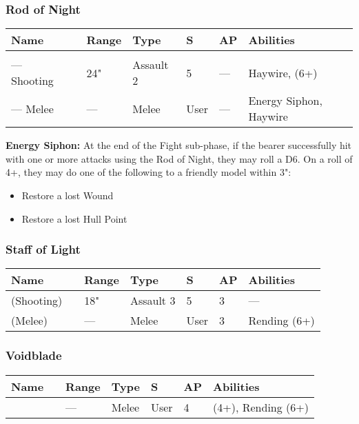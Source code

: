 \subsubsection{Rod of Night} \label{Rod of Night}
\noindent
\begin{tabular}{||m{110pt} m{30pt} m{31pt} m{55pt} m{12pt} m{12pt} m{210pt}||}
	\hline
	Name & & Range & Type & S & AP & Abilities \\
	\hline
	\quickref{Rod of Night} &  &  &  &  & \\
	— Shooting & & 24" & Assault 2 & 5 & — & Haywire, \quickref{Tesla} (6+) \\
	— Melee & & — & Melee & User & — & Energy Siphon, Haywire \\
	\hline
\end{tabular}
\label{Energy Siphon}
\textbf{Energy Siphon:} At the end of the Fight sub-phase, if the bearer successfully hit with one or more attacks using the Rod of Night, they may roll a D6. On a roll of 4+, they may do one of the following to a friendly model within 3":
\begin{itemize}
	\item Restore a lost Wound
	\item Restore a lost Hull Point
\end{itemize}
	

\subsubsection{Staff of Light} \label{Staff of Light}
\noindent
\begin{tabular}{||m{110pt} m{30pt} m{31pt} m{55pt} m{12pt} m{12pt} m{210pt}||}
	\hline
	Name & & Range & Type & S & AP & Abilities \\
	\hline
	\quickref{Staff of Light} (Shooting) & & 18" & Assault 3 & 5 & 3 & — \\
	\quickref{Staff of Light} (Melee) & & — & Melee & User & 3 & Rending (6+) \\
	\hline
\end{tabular}

\subsubsection{Voidblade} \label{Voidblade}
\noindent
\begin{tabular}{||m{110pt} m{30pt} m{31pt} m{55pt} m{12pt} m{12pt} m{210pt}||}
	\hline
	Name & & Range & Type & S & AP & Abilities \\
	\hline
	\quickref{Voidblade} &  & — & Melee & User & 4 & \quickref{Entropic Strike} (4+), Rending (6+) \\
	\hline
\end{tabular}

